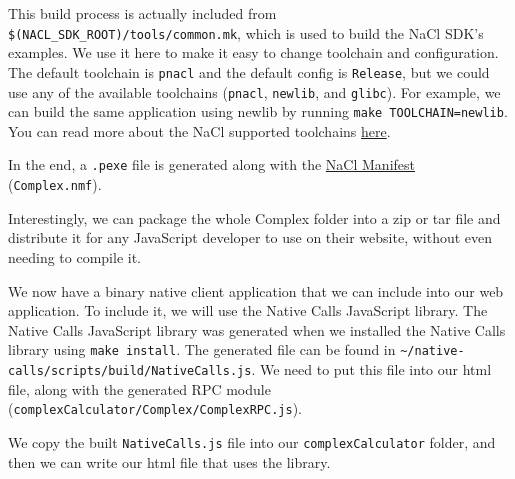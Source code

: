 This build process is actually included from
\texttt{\$(NACL\_SDK\_ROOT)/tools/common.mk}, which is used to build the
NaCl SDK's examples. We use it here to make it easy to change toolchain
and configuration. The default toolchain is \texttt{pnacl} and the
default config is \texttt{Release}, but we could use any of the
available toolchains (\texttt{pnacl}, \texttt{newlib}, and
\texttt{glibc}). For example, we can build the same application using
newlib by running \texttt{make TOOLCHAIN=newlib}. You can read more
about the NaCl supported toolchains
\href{https://developer.chrome.com/native-client/devguide/devcycle/building}{here}.

In the end, a \texttt{.pexe} file is generated along with the
\href{https://developer.chrome.com/native-client/reference/nacl-manifest-format}{NaCl
Manifest} (\texttt{Complex.nmf}).

Interestingly, we can package the whole Complex folder into a zip or tar
file and distribute it for any JavaScript developer to use on their
website, without even needing to compile it.


We now have a binary native client application that we can include into
our web application. To include it, we will use the Native Calls
JavaScript library. The Native Calls JavaScript library was generated
when we installed the Native Calls library using \texttt{make install}.
The generated file can be found in
\texttt{\textasciitilde{}/native-calls/scripts/build/NativeCalls.js}. We
need to put this file into our html file, along with the generated RPC
module (\texttt{complexCalculator/Complex/ComplexRPC.js}).

We copy the built \texttt{NativeCalls.js} file into our
\texttt{complexCalculator} folder, and then we can write our html file
that uses the library.

\begin{Shaded}
\begin{Highlighting}[]
 
 
\end{Highlighting}
\end{Shaded}

